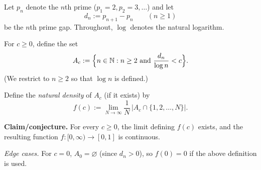 Let $p_n$ denote the $n$th prime ($p_1=2,p_2=3,\dots$) and let
\[d_n := p_{n+1}-p_n \qquad (n\ge 1)\]
be the $n$th prime gap. Throughout, $\log$ denotes the natural logarithm.

For $c\ge 0$, define the set
\[A_c := \Bigl\{n\in\mathbb{N} : n\ge 2\ \text{and}\ \frac{d_n}{\log n} < c\Bigr\}.
\]
(We restrict to $n\ge 2$ so that $\log n$ is defined.)

Define the \emph{natural density} of $A_c$ (if it exists) by
\[
  f(c) := \lim_{N\to\infty} \frac{1}{N}\,\bigl|A_c\cap\{1,2,\dots,N\}\bigr|.
\]

\textbf{Claim/conjecture.} For every $c\ge 0$, the limit defining $f(c)$ exists, and the resulting function $f:[0,\infty)\to[0,1]$ is continuous.

\smallskip
\emph{Edge cases.} For $c=0$, $A_0=\varnothing$ (since $d_n>0$), so $f(0)=0$ if the above definition is used.

\item
